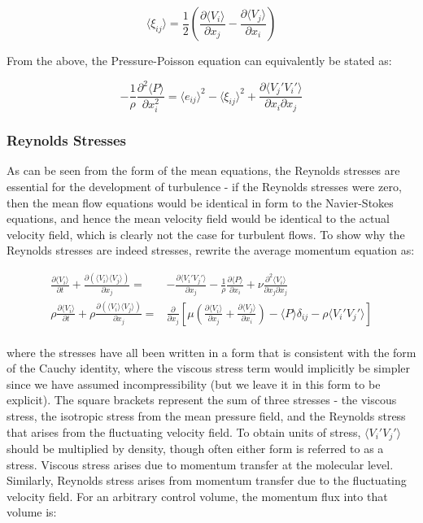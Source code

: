 \documentclass[10pt]{article}
\newcommand{\beq}{\begin{equation}}
\newcommand{\eeq}{\end{equation}}
\newcommand{\beqa}{\begin{equation}\begin{aligned}}
\newcommand{\eeqa}{\end{aligned}\end{equation}}
\newcommand{\la}{\langle}
\newcommand{\ra}{\rangle}
\begin{document}
\begin{flushleft}
\beq
\la \xi_{ij}\ra=\frac{1}{2}\left(\frac{\partial\la V_i\ra}{\partial x_j}-\frac{\partial\la V_j\ra}{\partial x_i}\right)
\eeq 

From the above, the Pressure-Poisson equation can equivalently be stated as:

\beq
-\frac{1}{\rho}\frac{\partial^2\la P\ra}{\partial x_i^2}=\la e_{ij}\ra^2-\la \xi_{ij}\ra^2+\frac{\partial \la V_j'V_i'\ra}{\partial x_i\partial x_j}
\eeq




\subsubsection{Reynolds Stresses}

As can be seen from the form of the mean equations, the Reynolds stresses are essential for the development of turbulence - if the Reynolds stresses were zero, then the mean flow equations would be identical in form to the Navier-Stokes equations, and hence the mean velocity field would be identical to the actual velocity field, which is clearly not the case for turbulent flows. To show why the Reynolds stresses are indeed stresses, rewrite the average momentum equation as:

\beqa
\label{eq:RewrittenMom}
\frac{\partial \la V_i\ra}{\partial t}+\frac{\partial(\la V_i\ra\la V_j\ra)}{\partial x_j}=&-\frac{\partial\la V_i'V_j'\ra}{\partial x_j}-\frac{1}{\rho}\frac{\partial \la P\ra}{\partial x_i}+\nu\frac{\partial^2 \la V_i\ra}{\partial x_j\partial x_j}\\
\rho\frac{\partial \la V_i\ra}{\partial t}+\rho\frac{\partial(\la V_i\ra\la V_j\ra)}{\partial x_j}=&\frac{\partial}{\partial x_j}\left\lbrack\mu\left(\frac{\partial\la V_i\ra}{\partial x_j}+\frac{\partial\la V_j\ra}{\partial x_i}\right)-\la P\ra\delta_{ij}-\rho\la V_i'V_j'\ra\right\rbrack\\
\eeqa

where the stresses have all been written in a form that is consistent with the form of the Cauchy identity, where the viscous stress term would implicitly be simpler since we have assumed incompressibility (but we leave it in this form to be explicit). The square brackets represent the sum of three stresses - the viscous stress, the isotropic stress from the mean pressure field, and the Reynolds stress that arises from the fluctuating velocity field. To obtain units of stress, \(\la V_i'V_j'\ra\) should be multiplied by density, though often either form is referred to as a stress. Viscous stress arises due to momentum transfer at the molecular level. Similarly, Reynolds stress arises from momentum transfer due to the fluctuating velocity field. For an arbitrary control volume, the momentum flux into that volume is:


\end{flushleft}
\end{document}
